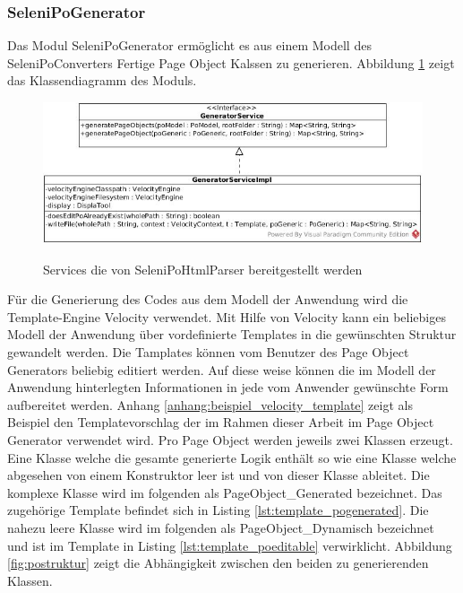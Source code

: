 \subsubsection{SeleniPoGenerator}
\label{sec:selenipogenerator}
Das Modul SeleniPoGenerator ermöglicht es aus einem Modell des SeleniPoConverters Fertige Page Object Kalssen zu generieren.
Abbildung \ref{fig:generator_service} zeigt das Klassendiagramm des Moduls.

\begin{figure}[htb]
  \centering  
  \includegraphics[scale=0.5]{img/SelenipoGenerator.jpg}\\
  \caption{Services die von SeleniPoHtmlParser bereitgestellt werden}
  \label{fig:generator_service}
\end{figure}
Für die Generierung des Codes aus dem Modell der Anwendung wird die Template-Engine Velocity \cite{apache_software_foundation_apache_2015} verwendet.
Mit Hilfe von Velocity kann ein beliebiges Modell der Anwendung über vordefinierte Templates in die gewünschten Struktur gewandelt werden.
Die Tamplates können vom Benutzer des Page Object Generators beliebig editiert werden. Auf diese weise können die im Modell der Anwendung hinterlegten Informationen in jede vom Anwender gewünschte Form aufbereitet werden. Anhang \ref{anhang:beispiel_velocity_template} zeigt als Beispiel den Templatevorschlag der im Rahmen dieser Arbeit im Page Object Generator verwendet wird.
Pro Page Object werden jeweils zwei Klassen erzeugt. Eine Klasse welche die gesamte generierte Logik enthält so wie eine Klasse welche abgesehen von einem Konstruktor leer ist und von dieser Klasse ableitet. 
Die komplexe Klasse wird im folgenden als PageObject\_Generated bezeichnet. Das zugehörige Template befindet sich in Listing \ref{lst:template_pogenerated}. Die
nahezu leere Klasse wird im folgenden als PageObject\_Dynamisch bezeichnet und ist im Template in Listing \ref{lst:template_poeditable} verwirklicht.
Abbildung \ref{fig:postruktur} zeigt die Abhängigkeit zwischen den beiden zu generierenden Klassen.

